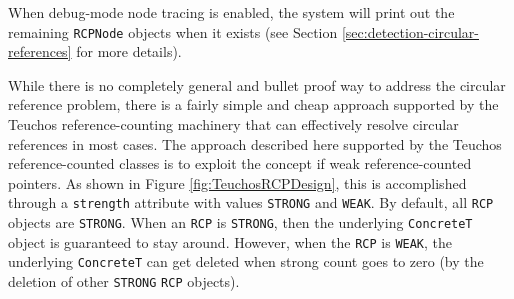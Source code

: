 \documentclass[pdf,ps2pdf,11pt]{SANDreport}
\begin{document}
When debug-mode node tracing is enabled, the system will print out the
remaining {}\texttt{RCPNode} objects when it exists (see Section
{}\ref{sec:detection-circular-references} for more details).

While there is no completely general and bullet proof way to address
the circular reference problem, there is a fairly simple and cheap
approach supported by the Teuchos reference-counting machinery that
can effectively resolve circular references in most cases.  The
approach described here supported by the Teuchos reference-counted
classes is to exploit the concept if weak reference-counted pointers.
As shown in Figure {}\ref{fig:TeuchosRCPDesign}, this is accomplished
through a {}\texttt{strength} attribute with values {}\texttt{STRONG}
and {}\texttt{WEAK}.  By default, all {}\texttt{RCP} objects are
{}\texttt{STRONG}.  When an {}\texttt{RCP} is {}\texttt{STRONG}, then
the underlying {}\texttt{ConcreteT} object is guaranteed to stay
around.  However, when the {}\texttt{RCP} is {}\texttt{WEAK}, the
underlying {}\texttt{ConcreteT} can get deleted when strong count goes
to zero (by the deletion of other {}\texttt{STRONG} {}\texttt{RCP}
objects).
\end{document}
